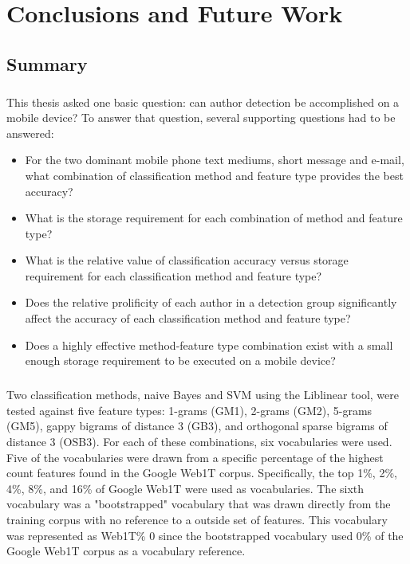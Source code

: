\chapter{Conclusions and Future Work}

\section{Summary}
\paragraph*{} This thesis asked one basic question: can author detection be accomplished on a mobile device?  To answer that question, several supporting questions had to be answered: 
\begin{itemize}
	\item For the two dominant mobile phone text mediums, short message and e-mail, what combination of classification method and feature type provides the best accuracy?
	\item What is the storage requirement for each combination of method and feature type?
	\item What is the relative value of classification accuracy versus storage requirement for each classification method and feature type?
	\item Does the relative prolificity of each author in a detection group significantly affect the accuracy of each classification method and feature type?
	\item Does a highly effective method-feature type combination exist with a small enough storage requirement to be executed on a mobile device?
\end{itemize}

	\paragraph*{} Two classification methods, naive Bayes and SVM using the Liblinear tool, were tested against five feature types: 1-grams (GM1), 2-grams (GM2), 5-grams (GM5), gappy bigrams of distance 3 (GB3), and orthogonal sparse bigrams of distance 3 (OSB3).  For each of these combinations, six vocabularies were used.  Five of the vocabularies were drawn from a specific percentage of the highest count features found in the Google Web1T corpus.  Specifically, the top 1\%, 2\%, 4\%, 8\%, and 16\% of Google Web1T were used as vocabularies.  The sixth vocabulary was a "bootstrapped" vocabulary that was drawn directly from the training corpus with no reference to a outside set of features.  This vocabulary was represented as Web1T\% 0 since the bootstrapped vocabulary used 0\% of the Google Web1T corpus as a vocabulary reference.

